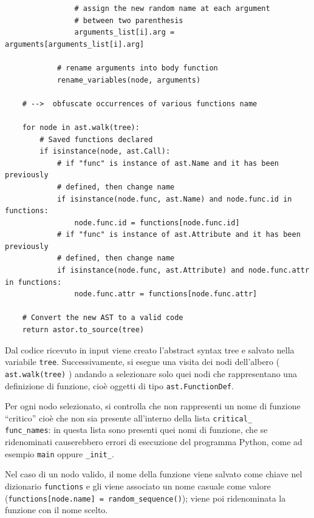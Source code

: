 \documentclass[a4paper,oneside,openright,titlepage,10pt,footinclude,headinclude]{scrbook}
\begin{document}
\begin{graybox}[innerleftmargin=2,]
\begin{lstlisting}
                # assign the new random name at each argument 
                # between two parenthesis
                arguments_list[i].arg = arguments[arguments_list[i].arg]

            # rename arguments into body function
            rename_variables(node, arguments)

    # -->  obfuscate occurrences of various functions name

    for node in ast.walk(tree):
        # Saved functions declared
        if isinstance(node, ast.Call):
            # if "func" is instance of ast.Name and it has been previously 
            # defined, then change name
            if isinstance(node.func, ast.Name) and node.func.id in functions:
                node.func.id = functions[node.func.id]
            # if "func" is instance of ast.Attribute and it has been previously 
            # defined, then change name
            if isinstance(node.func, ast.Attribute) and node.func.attr in functions:
                node.func.attr = functions[node.func.attr]

    # Convert the new AST to a valid code
    return astor.to_source(tree)
\end{lstlisting}
\end{graybox}
Dal codice ricevuto in input viene creato l'abstract syntax tree e salvato nella variabile \texttt{tree}. Successivamente, si esegue una visita dei nodi dell'albero ( \texttt{ast.walk(tree)} ) andando a selezionare solo quei nodi che rappresentano una definizione di funzione, cioè oggetti di tipo \texttt{ast.FunctionDef}.

Per ogni nodo selezionato, si controlla che non rappresenti un nome di funzione ``critico'' cioè che non sia presente all'interno della lista \texttt{critical\_\\func\_names}: in questa lista sono presenti quei nomi di funzione, che se ridenominati causerebbero errori di esecuzione del programma Python, come ad esempio \texttt{main} oppure \texttt{\_init\_}.

Nel caso di un nodo valido, il nome della funzione viene salvato come chiave nel dizionario \texttt{functions} e gli viene associato  un nome casuale come valore (\texttt{functions[node.name] = random\_sequence()}); viene poi ridenominata la funzione con il nome scelto.
\end{document}
